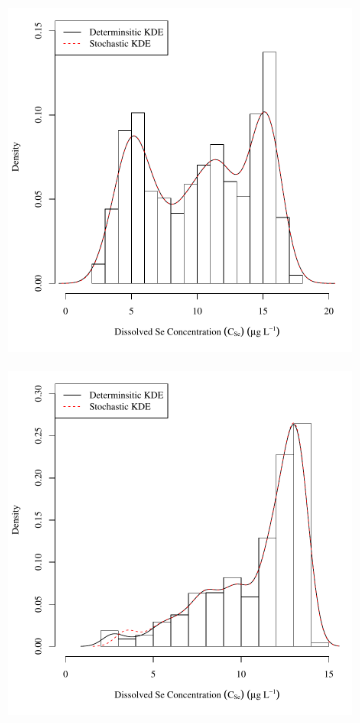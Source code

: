 \begin{linenumbers}
\subfiguretop
\begin{landscape}
	\begin{figure}
		\begin{subfigure}{0.7\textwidth}
			\centering
			\includegraphics[width=\tableCustomSize]{"Figures/Results_USR/Stochastic/c d&s est U163"}
		\end{subfigure}%
		\begin{subfigure}{0.7\textwidth}
			\centering
			\includegraphics[width=\tableCustomSize]{"Figures/Results_USR/Stochastic/c d&s est U201"}

\end{subfigure}
\end{figure}
\end{landscape}
\end{linenumbers}
